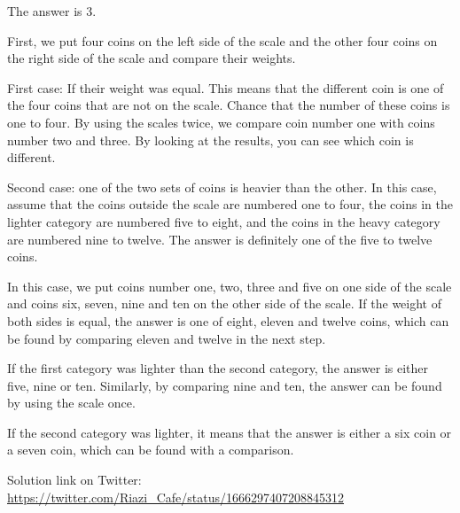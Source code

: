 \begin{solution}
The answer is 3.

First, we put four coins on the left side of the scale and the other four coins on the right side of the scale and compare their weights.

First case: If their weight was equal. This means that the different coin is one of the four coins that are not on the scale. Chance that the number of these coins is one to four. By using the scales twice, we compare coin number one with coins number two and three. By looking at the results, you can see which coin is different.

Second case: one of the two sets of coins is heavier than the other. In this case, assume that the coins outside the scale are numbered one to four, the coins in the lighter category are numbered five to eight, and the coins in the heavy category are numbered nine to twelve. The answer is definitely one of the five to twelve coins.

In this case, we put coins number one, two, three and five on one side of the scale and coins six, seven, nine and ten on the other side of the scale. If the weight of both sides is equal, the answer is one of eight, eleven and twelve coins, which can be found by comparing eleven and twelve in the next step.

If the first category was lighter than the second category, the answer is either five, nine or ten. Similarly, by comparing nine and ten, the answer can be found by using the scale once.

If the second category was lighter, it means that the answer is either a six coin or a seven coin, which can be found with a comparison.

Solution link on Twitter:  \href{https://twitter.com/Riazi_Cafe/status/1666297407208845312}{https://twitter.com/Riazi_Cafe/status/1666297407208845312}\end{solution}